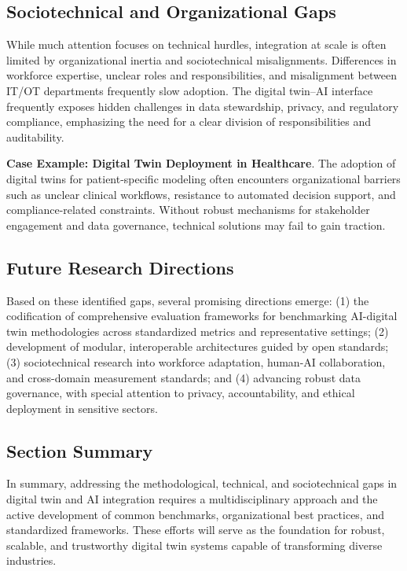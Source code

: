 \documentclass[sigconf]{acmart}
\begin{document}
\subsection{Sociotechnical and Organizational Gaps}

While much attention focuses on technical hurdles, integration at scale is often limited by organizational inertia and sociotechnical misalignments. Differences in workforce expertise, unclear roles and responsibilities, and misalignment between IT/OT departments frequently slow adoption. The digital twin–AI interface frequently exposes hidden challenges in data stewardship, privacy, and regulatory compliance, emphasizing the need for a clear division of responsibilities and auditability.

\textbf{Case Example: Digital Twin Deployment in Healthcare}. The adoption of digital twins for patient-specific modeling often encounters organizational barriers such as unclear clinical workflows, resistance to automated decision support, and compliance-related constraints. Without robust mechanisms for stakeholder engagement and data governance, technical solutions may fail to gain traction.

\subsection{Future Research Directions}

Based on these identified gaps, several promising directions emerge: (1) the codification of comprehensive evaluation frameworks for benchmarking AI-digital twin methodologies across standardized metrics and representative settings; (2) development of modular, interoperable architectures guided by open standards; (3) sociotechnical research into workforce adaptation, human-AI collaboration, and cross-domain measurement standards; and (4) advancing robust data governance, with special attention to privacy, accountability, and ethical deployment in sensitive sectors.

\subsection{Section Summary}

In summary, addressing the methodological, technical, and sociotechnical gaps in digital twin and AI integration requires a multidisciplinary approach and the active development of common benchmarks, organizational best practices, and standardized frameworks. These efforts will serve as the foundation for robust, scalable, and trustworthy digital twin systems capable of transforming diverse industries.
\end{document}

